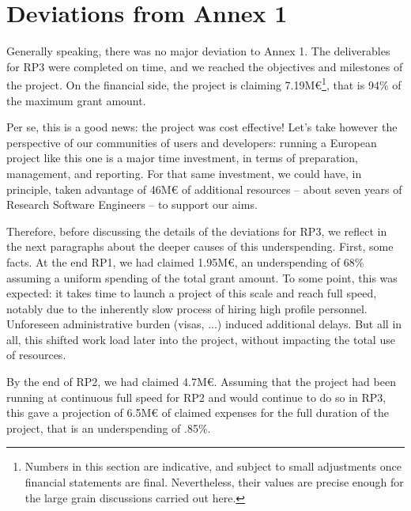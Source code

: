 \section{Deviations from Annex 1}
\label{section.deviations}

Generally speaking, there was no major deviation to Annex 1. The
deliverables for RP3 were completed on time, and we reached the
objectives and milestones of the project. On the financial side, the
project is claiming 7.19M€\footnote{Numbers in this section are
  indicative, and subject to small adjustments once financial
  statements are final. Nevertheless, their values are precise enough
  for the large grain discussions carried out here.}, that is 94\% of
the maximum grant amount.

Per se, this is a good news: the project was cost effective! Let's
take however the perspective of our communities of users and
developers: running a European project like this one is a major time
investment, in terms of preparation, management, and reporting. For
that same investment, we could have, in principle, taken advantage of
46M€ of additional resources -- about seven years of Research
Software Engineers -- to support our aims.

Therefore, before discussing the details of the deviations for RP3, we
reflect in the next paragraphs about the deeper causes of this
underspending. First, some facts. At the end RP1, we had claimed
1.95M€, an underspending of 68\% assuming a uniform spending of the
total grant amount. To some point, this was expected: it takes time to
launch a project of this scale and reach full speed, notably due to
the inherently slow process of hiring high profile personnel.
Unforeseen administrative burden (visas, ...) induced additional
delays. But all in all, this shifted work load later into the project,
without impacting the total use of resources.

By the end of RP2, we had claimed 4.7M€. Assuming that the project had
been running at continuous full speed for RP2 and would continue to do
so in RP3, this gave a projection of 6.5M€ of claimed expenses for the
full duration of the project, that is an underspending of .85\%.

